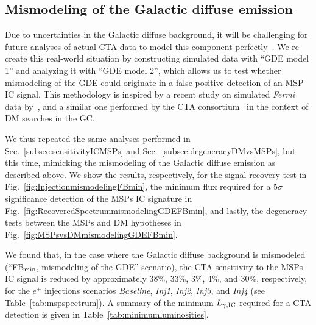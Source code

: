 \documentclass[doublespace,nopageskip]{VTthesis} %
\begin{document}
\subsection{Mismodeling of the Galactic diffuse emission}
\label{subsec:GDEmismodeling}

Due to uncertainties in the Galactic diffuse background, it will be challenging for future analyses of actual CTA data to model this component perfectly~\citep{Acharyya:2020sbj}. 
%
We re-create this  
real-world situation
by constructing simulated data with ``GDE model 1'' and analyzing it with ``GDE model 2'', which allows us to test whether mismodeling of the GDE could originate in a false positive detection of an MSP IC signal. This methodology is inspired by a recent study on simulated {\it Fermi} data by~\citep{Chang:2019ars}, and a similar one performed by the CTA consortium~\citep{Acharyya:2020sbj} in the context of DM searches in the GC. 

We thus repeated the same analyses performed in Sec.~\ref{subsec:sensitivityICMSPs} and Sec.~\ref{subsec:degeneracyDMvsMSPs}, but this time, mimicking the mismodeling of the Galactic diffuse emission as described above. We show the results, respectively, for the signal recovery test in Fig.~\ref{fig:InjectionmismodelingFBmin}, the minimum flux required for a $5\sigma$ significance detection of the MSPs IC signature in Fig.~\ref{fig:RecoveredSpectrummismodelingGDEFBmin}, and lastly, the degeneracy tests between the MSPs and DM hypotheses in Fig.~\ref{fig:MSPsvsDMmismodelingGDEFBmin}. 

We found that, in the case where the Galactic diffuse background is mismodeled (``FB$_{\rm min}$, mismodeling of the GDE'' scenario), the CTA sensitivity to the MSPs IC signal is reduced   by approximately 38\%, 33\%, 3\%, 4\%, and 30\%, respectively, for the $e^\pm$ injections scenarios  \textit{Baseline}, \textit{Inj1}, \textit{Inj2}, \textit{Inj3}, and \textit{Inj4} (see Table~\ref{tab:mspspectrum}). A summary of the minimum $L_{\gamma, {\rm IC}}$ required for a CTA detection is given in Table~\ref{tab:minimumluminosities}.
\end{document}
